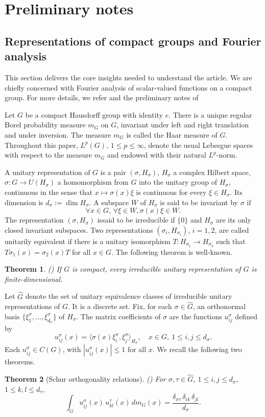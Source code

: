\documentclass[11pt]{amsart}
\newtheorem{theorem}{Theorem}[section]
\begin{document}
\section{Preliminary notes}\label{sec:prelim}
\subsection{Representations of compact groups and Fourier analysis}

This section delivers the core insights needed to understand the article. We are chiefly concerned with Fourier analysis of scalar-valued functions on a compact group.
 For more details, we refer \cite{Folland} and the preliminary notes of \cite{Kumar2024}
 
\noindent Let $G$ be a compact Hausdorff group with identity $e$. There is a unique
regular Borel probability measure $m_G$  on $G$, invariant under left and right
translation and under inversion.  
The measure $m_G$ is called the Haar measure of $G$. Throughout this  paper, 
 $L^p(G), \,1\le p\le\infty$, denote the usual Lebesgue spaces  with respect to the measure $m_G$ and endowed with their natural $L^p$-norm.


\noindent A unitary representation of $G$ is a pair $(\sigma,H_\sigma)$, $H_\sigma$ a
complex Hilbert space, $\sigma:G\to U(H_\sigma)$ a homomorphism from $G$ into the unitary group
of $H_\sigma$, continuous in the sense that $x\mapsto\sigma(x)\xi$ is continuous for
every $\xi\in H_\sigma$. Its dimension is $d_\sigma:=\dim H_\sigma$. A subspace $W$ of $H_\sigma$ is said to be invariant by $\sigma$ if $$\forall x\in G,\,\forall \xi\in W, \sigma(x)\xi\in W.$$
The representation $(\sigma,H_\sigma)$ issaid to be  irreducible if $\{0\}$ and $H_\sigma$ are its only closed
invariant subspaces. Two representations $(\sigma_i,H_{\sigma_i})$,
$i=1,2$, are called unitarily equivalent if there is a unitary isomorphism  $T:H_{\sigma_1}\to
H_{\sigma_2}$ such that $T\sigma_1(x)=\sigma_2(x)T$ for all $x\in G$.
The following theorem is well-known. 
\begin{theorem}(\cite[page 126]{Folland})
If $G$ is compact, every irreducible unitary representation of $G$ is
finite-dimensional.
\end{theorem}

\noindent Let $\widehat{G}$ denote the set of unitary equivalence classes of irreducible unitary
representations of $G$.  It is a discrete set.
Fix, for each $\sigma\in\widehat{G}$, an orthonormal basis $\{\xi_1^\sigma,\dots,
\xi_{d_\sigma}^\sigma\}$ of $H_\sigma$. The matrix coefficients of $\sigma$ are the functions $u^\sigma_{ij}$ defined by
\[
u^\sigma_{ij}(x)=\langle\sigma(x)\xi_i^\sigma,\xi_j^\sigma\rangle_{H_\sigma},\quad
x\in G,\ 1\le i,j\le d_\sigma.
\]
Each $u^\sigma_{ij}\in C(G)$, with $|u^\sigma_{ij}(x)|\le1$ for all $x$.
We recall the following two theorems. 
\begin{theorem}[Schur orthogonality relations](\cite[page 129]{Folland})
For $\sigma,\tau\in\widehat{G}$, $1\le i,j\le d_\sigma$, $1\le k,l\le d_\tau$,
\[
\int_G u^\sigma_{ij}(x)\,\overline{u^\tau_{kl}(x)}\,dm_G(x)=
\frac{\delta_{\sigma\tau}\,\delta_{ik}\,\delta_{jl}}{d_\sigma}.
\]

\end{theorem}
\end{document}
